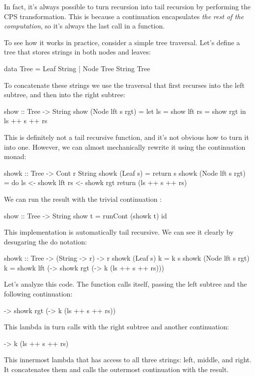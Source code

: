 \documentclass[DaoFP]{subfiles}
\begin{document}
In fact, it's always possible to turn recursion into tail recursion by performing the CPS transformation. This is because a continuation encapsulates \emph{the rest of the computation}, so it's always the last call in a function. 

To see how it works in practice, consider a simple tree traversal. Let's define a tree that stores strings in both nodes and leaves:
\begin{haskell}
data Tree = Leaf String 
          | Node Tree String Tree
\end{haskell}
To concatenate these strings we use the traversal that first recurses into the left subtree, and then into the right subtree:
\begin{haskell}
show :: Tree -> String
show (Node lft s rgt) =
  let ls = show lft
      rs = show rgt
  in ls ++ s ++ rs
\end{haskell}
This is definitely not a tail recursive function, and it's not obvious how to turn it into one. However, we can almost mechanically rewrite it using the continuation monad:
\begin{haskell}
showk :: Tree -> Cont r String
showk (Leaf s) = return s
showk (Node lft s rgt) = do
  ls <- showk lft
  rs <- showk rgt
  return (ls ++ s ++ rs)
 \end{haskell}
We can run the result with the trivial continuation :
\begin{haskell}
show :: Tree -> String
show t = runCont (showk t) id
\end{haskell}

This implementation is automatically tail recursive. We can see it clearly by desugaring the do notation:
\begin{haskell}
showk :: Tree -> (String -> r) -> r
showk (Leaf s) k = k s
showk (Node lft s rgt) k =
  showk lft (\ls -> 
    showk rgt (\rs -> 
      k (ls ++ s ++ rs)))
\end{haskell}
Let's analyze this code. The function calls itself, passing the left subtree  and the following continuation:
\begin{haskell}
\ls -> 
    showk rgt (\rs -> 
      k (ls ++ s ++ rs))
\end{haskell}
This lambda in turn calls  with the right subtree  and another continuation:
\begin{haskell}
\rs -> k (ls ++ s ++ rs)
\end{haskell}
This innermost lambda that has access to all three strings: left, middle, and right. It concatenates them and calls the outermost continuation  with the result.
\end{document}
